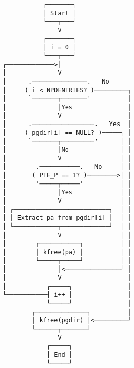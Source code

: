 \documentclass[varwidth,crop]{standalone}
\begin{document}
\begin{verbatim}
           ┌───────┐
           │ Start │
           └───┬───┘
               V
           ┌───────┐
           │ i = 0 │
           └───┬───┘
┌─────────────>│
│              V
│      .───────────────.   No
│     ( i < NPDENTRIES? )─────────┐
│      `───────┬───────'          │
│              │Yes               │
│              V                  │
│      .─────────────────.   Yes  │
│     ( pgdir[i] == NULL? )─────┐ │
│      `───────┬─────────'      │ │
│              │No              │ │
│              V                │ │
│        .───────────.   No     │ │
│       ( PTE_P == 1? )────────>│ │
│        '─────┬─────'          │ │
│              │Yes             │ │
│              V                │ │
│ ┌──────────────────────────┐  │ │
│ │ Extract pa from pgdir[i] │  │ │
│ └────────────┬─────────────┘  │ │
│              V                │ │
│        ┌───────────┐          │ │
│        │ kfree(pa) │          │ │
│        └─────┬─────┘          │ │
│              │<───────────────┘ │
│              V                  │
│           ┌─────┐               │
└───────────┤ i++ │               │
            └─────┘               │
        ┌──────────────┐          │
        │ kfree(pgdir) │<─────────┘
        └──────┬───────┘
               V
            ┌─────┐
            │ End │
            └─────┘
\end{verbatim}
\end{document}
